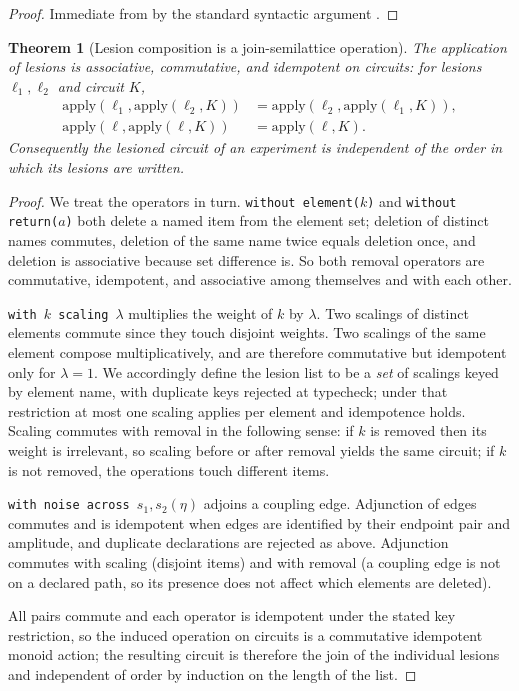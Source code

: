 \documentclass[11pt,twocolumn,a4paper]{article}
\theoremstyle{thmstyle}
\newtheorem{theorem}{Theorem}[section]
\theoremstyle{definition}
\theoremstyle{remark}
\begin{document}
\begin{proof}
Immediate from  by the standard syntactic
argument \citep{wright1994}.
\end{proof}

\begin{theorem}[Lesion composition is a join-semilattice operation]
\label{thm:lesion-monoid}
The application of lesions is associative, commutative, and idempotent on
circuits: for lesions $\ell_1,\ell_2$ and circuit $K$,
\begin{align*}
\mathrm{apply}(\ell_1,\mathrm{apply}(\ell_2,K))
&=\mathrm{apply}(\ell_2,\mathrm{apply}(\ell_1,K)),\\
\mathrm{apply}(\ell,\mathrm{apply}(\ell,K))&=\mathrm{apply}(\ell,K).
\end{align*}
Consequently the lesioned circuit of an experiment is independent of the order
in which its lesions are written.
\end{theorem}

\begin{proof}
We treat the operators in turn. \texttt{without element($k$)} and
\texttt{without return($a$)} both delete a named item from the element set;
deletion of distinct names commutes, deletion of the same name twice equals
deletion once, and deletion is associative because set difference is. So both
removal operators are commutative, idempotent, and associative among
themselves and with each other.

\texttt{with $k$ scaling $\lambda$} multiplies the weight of $k$ by $\lambda$.
Two scalings of distinct elements commute since they touch disjoint weights.
Two scalings of the same element compose multiplicatively, and are therefore
commutative but idempotent only for $\lambda=1$. We accordingly define the
lesion list to be a \emph{set} of scalings keyed by element name, with
duplicate keys rejected at typecheck; under that restriction at most one
scaling applies per element and idempotence holds. Scaling commutes with
removal in the following sense: if $k$ is removed then its weight is
irrelevant, so scaling before or after removal yields the same circuit; if $k$
is not removed, the operations touch different items.

\texttt{with noise across $s_1,s_2(\eta)$} adjoins a coupling edge. Adjunction
of edges commutes and is idempotent when edges are identified by their
endpoint pair and amplitude, and duplicate declarations are rejected as above.
Adjunction commutes with scaling (disjoint items) and with removal (a coupling
edge is not on a declared path, so its presence does not affect which elements
are deleted).

All pairs commute and each operator is idempotent under the stated key
restriction, so the induced operation on circuits is a commutative idempotent
monoid action; the resulting circuit is therefore the join of the individual
lesions and independent of order by induction on the length of the list.
\end{proof}
\end{document}
